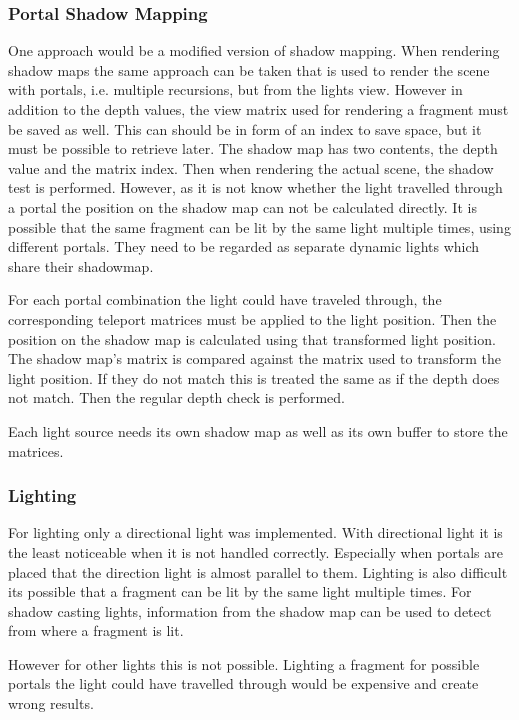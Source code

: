 \subsubsection{Portal Shadow Mapping}
One approach would be a modified version of shadow mapping. When rendering shadow maps the same approach can be taken that is used to render the scene with portals, i.e. multiple recursions, but from the lights view. However in addition to the depth values, the view matrix used for rendering a fragment must be saved as well. This can should be in form of an index to save space, but it must be possible to retrieve later. The shadow map has two contents, the depth value and the matrix index.
Then when rendering the actual scene, the shadow test is performed. However, as it is not know whether the light travelled through a portal the position on the shadow map can not be calculated directly. It is possible that the same fragment can be lit by the same light multiple times, using different portals. They need to be regarded as separate dynamic lights which share their shadowmap.

For each portal combination the light could have traveled through, the corresponding teleport matrices must be applied to the light position.  Then the position on the shadow map is calculated using that transformed light position. The shadow map's matrix is compared against the matrix used to transform the light position. If they do not match this is treated the same as if the depth does not match. Then the regular depth check is performed.

Each light source needs its own shadow map as well as its own buffer to store the matrices.

\subsubsection{Lighting}
For lighting only a directional light was implemented. With directional light it is the least noticeable when it is not handled correctly. Especially when portals are placed that the direction light is almost parallel to them.
Lighting is also difficult its possible that a fragment can be lit by the same light multiple times. For shadow casting lights, information from the shadow map can be used to detect from where a fragment is lit.

However for other lights this is not possible. Lighting a fragment for possible portals the light could have travelled through would be expensive and create wrong results.


